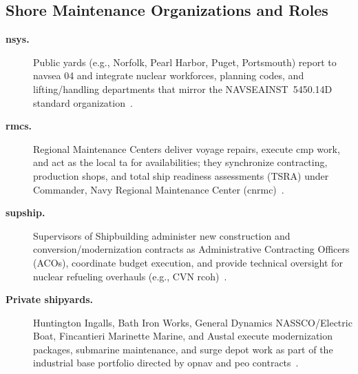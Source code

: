 \documentclass[../main.tex]{subfiles}
\begin{document}
\subsection{Shore Maintenance Organizations and Roles}
\begin{description}
\item[\textbf{\acp{nsy}.}] Public yards (e.g., Norfolk, Pearl Harbor, Puget, Portsmouth) report to \ac{navsea} 04 and integrate nuclear workforces, planning codes, and lifting/handling departments that mirror the NAVSEAINST~5450.14D standard organization~\autocite{NAVSEAINST5450-14D}.
\item[\textbf{\acp{rmc}.}] Regional Maintenance Centers deliver voyage repairs, execute \ac{cmp} work, and act as the local \ac{ta} for availabilities; they synchronize contracting, production shops, and total ship readiness assessments (TSRA) under Commander, Navy Regional Maintenance Center (\ac{cnrmc})~\autocite{NAVSEAINST5450-145A,edo-4-1-1-fleet-maint-assets-2025}.
\item[\textbf{\ac{supship}.}] Supervisors of Shipbuilding administer new construction and conversion/modernization contracts as Administrative Contracting Officers (ACOs), coordinate budget execution, and provide technical oversight for nuclear refueling overhauls (e.g., CVN \ac{rcoh})~\autocite{NAVSEAINST5450-145A,edo-4-1-1-fleet-maint-assets-2025}.
\item[\textbf{Private shipyards.}] Huntington Ingalls, Bath Iron Works, General Dynamics NASSCO/Electric Boat, Fincantieri Marinette Marine, and Austal execute modernization packages, submarine maintenance, and surge depot work as part of the industrial base portfolio directed by \ac{opnav} and \ac{peo} contracts~\autocite{edo-4-1-1-fleet-maint-assets-2025}.
\end{description}
\end{document}
